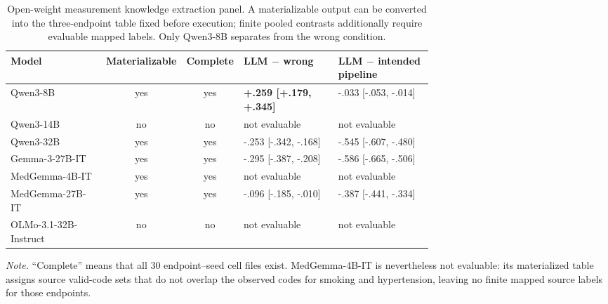 
\begin{table}[t]
\caption{Open-weight measurement knowledge extraction panel. A materializable output can be converted into the three-endpoint table fixed before execution; finite pooled contrasts additionally require evaluable mapped labels. Only Qwen3-8B separates from the wrong condition.}
\label{tab:app-extraction-model-panel}
\label{tab:app_llm_panel}
\centering\scriptsize
\setlength{\tabcolsep}{4pt}
\begin{tabular}{P{0.23\linewidth}ccP{0.235\linewidth}P{0.235\linewidth}}
\toprule Model & Materializable & Complete & LLM $-$ wrong & LLM $-$ intended pipeline \\
\midrule
Qwen3-8B & yes & yes & \textbf{+.259 [+.179, +.345]} & -.033 [-.053, -.014] \\
Qwen3-14B & no & no & not evaluable & not evaluable \\
Qwen3-32B & yes & yes & -.253 [-.342, -.168] & -.545 [-.607, -.480] \\
Gemma-3-27B-IT & yes & yes & -.295 [-.387, -.208] & -.586 [-.665, -.506] \\
MedGemma-4B-IT & yes & yes & not evaluable & not evaluable \\
MedGemma-27B-IT & yes & yes & -.096 [-.185, -.010] & -.387 [-.441, -.334] \\
OLMo-3.1-32B-Instruct & no & no & not evaluable & not evaluable \\
\bottomrule\end{tabular}
\vspace{2pt}\parbox{0.96\linewidth}{\footnotesize \emph{Note.} ``Complete'' means that all 30 endpoint--seed cell files exist. MedGemma-4B-IT is nevertheless not evaluable: its materialized table assigns source valid-code sets that do not overlap the observed codes for smoking and hypertension, leaving no finite mapped source labels for those endpoints.}
\end{table}

